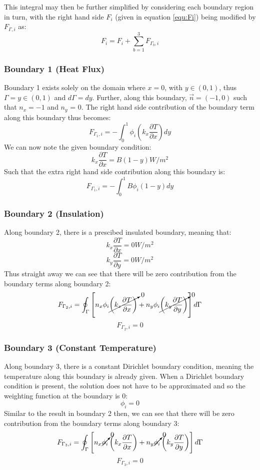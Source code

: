 \documentclass[letterpaper,10pt]{article}
\begin{document}
This integral may then be further simplified by considering each boundary region in turn, with the right hand side $F_i$ (given in equation \ref{equ:Fi}) being modified by $F_{\Gamma,i}$ as:
\[
\boxed{F_i = F_i + \displaystyle\sum\limits_{b=1}^3 F_{\Gamma_b,i}}
\]

\subsubsection{Boundary 1 (Heat Flux)}
Boundary 1 exists solely on the domain where $x=0$, with $y \in (0, 1)$, thus $\Gamma = y \in (0, 1)$ and $d\Gamma = dy$. Further, along this boundary, $\vec{n} = \left(-1,0\right)$ such that $n_x=-1$ and $n_y$ = 0. The right hand side contribution of the boundary term along this boundary thus becomes:
\[F_{\Gamma_1,i} = -\int_0^1 \phi_i\left(k_x\frac{\partial T}{\partial x}\right)dy\]
We can now note the given boundary condition:
\[k_x\frac{\partial T}{\partial x} = B \left(1-y\right) \unit{}{W/m^2}\]
Such that the extra right hand side contribution along this boundary is:
\begin{equation}
\label{equ:F1i}
\boxed{F_{\Gamma_1,i} = -\int_0^1 B \phi_i \left(1-y\right)dy}
\end{equation}

\subsubsection{Boundary 2 (Insulation)}
Along boundary 2, there is a prescibed insulated boundary, meaning that:
\[k_x\frac{\partial T}{\partial x} = \unit{0}{W/m^2}\]
\[k_y\frac{\partial T}{\partial y} = \unit{0}{W/m^2}\]
Thus straight away we can see that there will be zero contribution from the boundary terms along boundary 2:
\[
F_{\Gamma_2,i} = \oint_\Gamma \left[n_x\phi_i\cancelto{0}{\left(k_x\frac{\partial T}{\partial x}\right)} + n_y\phi_i\cancelto{0}{\left(k_y\frac{\partial T}{\partial y}\right)}\right]d\Gamma
\]
\begin{equation}
\label{equ:F2i}
\boxed{F_{\Gamma_2,i} = 0}
\end{equation}

\subsubsection{Boundary 3 (Constant Temperature)}
Along boundary 3, there is a constant Dirichlet boundary condition, meaning the temperature along this boundary is already given. When a Dirichlet boundary condition is present, the solution does not have to be approximated and so the weighting function at the boundary is 0:
\[\phi_i = 0\]
Similar to the result in boundary 2 then, we can see that there will be zero contribution from the boundary terms along boundary 3:
\[
F_{\Gamma_3,i} = \oint_\Gamma \left[n_x\cancelto{0}{\phi_i}\left(k_x\frac{\partial T}{\partial x}\right) + n_y\cancelto{0}{\phi_i}\left(k_y\frac{\partial T}{\partial y}\right)\right]d\Gamma
\]
\begin{equation}
\label{equ:F3i}
\boxed{F_{\Gamma_3,i} = 0}
\end{equation}
\end{document}
